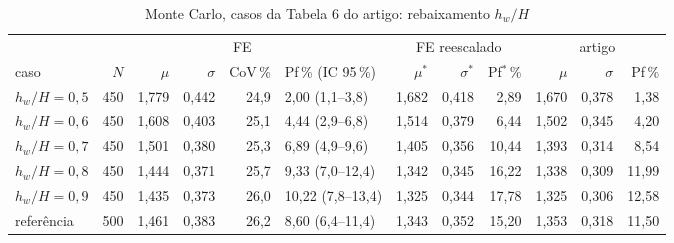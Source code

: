 \documentclass[11pt,a4paper]{article}
\begin{document}
\begin{table}[H]\centering\footnotesize\setlength{\tabcolsep}{3.2pt}\caption{Monte Carlo, casos da Tabela 6 do artigo: rebaixamento $h_w/H$}\label{tab:mc6}
\begin{tabular}{lrrrrlrrr>{\color{art}}r>{\color{art}}r>{\color{art}}r}\toprule & \multicolumn{5}{c}{FE} & \multicolumn{3}{c}{FE reescalado} & \multicolumn{3}{c}{\color{art}artigo}\\\cmidrule(lr){2-6}\cmidrule(lr){7-9}\cmidrule(l){10-12}caso & $N$ & $\mu$ & $\sigma$ & CoV\,\% & Pf\,\% (IC 95\,\%) & $\mu^*$ & $\sigma^*$ & Pf$^*$\,\% & $\mu$ & $\sigma$ & Pf\,\%\\\midrule
$h_w/H = 0{,}5$ & 450 & 1{,}779 & 0{,}442 & 24{,}9 & 2{,}00 (1{,}1--3{,}8) & 1{,}682 & 0{,}418 & 2{,}89 & 1{,}670 & 0{,}378 & 1{,}38\\
$h_w/H = 0{,}6$ & 450 & 1{,}608 & 0{,}403 & 25{,}1 & 4{,}44 (2{,}9--6{,}8) & 1{,}514 & 0{,}379 & 6{,}44 & 1{,}502 & 0{,}345 & 4{,}20\\
$h_w/H = 0{,}7$ & 450 & 1{,}501 & 0{,}380 & 25{,}3 & 6{,}89 (4{,}9--9{,}6) & 1{,}405 & 0{,}356 & 10{,}44 & 1{,}393 & 0{,}314 & 8{,}54\\
$h_w/H = 0{,}8$ & 450 & 1{,}444 & 0{,}371 & 25{,}7 & 9{,}33 (7{,}0--12{,}4) & 1{,}342 & 0{,}345 & 16{,}22 & 1{,}338 & 0{,}309 & 11{,}99\\
$h_w/H = 0{,}9$ & 450 & 1{,}435 & 0{,}373 & 26{,}0 & 10{,}22 (7{,}8--13{,}4) & 1{,}325 & 0{,}344 & 17{,}78 & 1{,}325 & 0{,}306 & 12{,}58\\
referência & 500 & 1{,}461 & 0{,}383 & 26{,}2 & 8{,}60 (6{,}4--11{,}4) & 1{,}343 & 0{,}352 & 15{,}20 & 1{,}353 & 0{,}318 & 11{,}50\\
\bottomrule\end{tabular}
\end{table}
\end{document}
